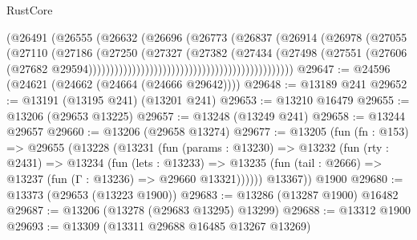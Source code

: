 \begin{lexlean}{RustCore}
\begin{coremodule}
                                                            (@26491
                                                              (@26555
                                                                (@26632
                                                                  (@26696
                                                                    (@26773
                                                                      (@26837
                                                                        (@26914
                                                                          (@26978
                                                                            (@27055
                                                                              (@27110
                                                                                (@27186
                                                                                  (@27250
                                                                                    (@27327
                                                                                      (@27382
                                                                                        (@27434
                                                                                          (@27498
                                                                                            (@27551
                                                                                              (@27606
                                                                                                (@27682
                                                                                                  @29594)))))))))))))))))))))))))))))))))))))))))))))))
@29647 := @24596 (@24621 (@24662 (@24664 (@24666 @29642))))
@29648 := @13189 @241
@29652 := @13191 (@13195 @241) (@13201 @241)
@29653 := @13210 @16479
@29655 := @13206 (@29653 @13225)
@29657 := @13248 (@13249 @241)
@29658 := @13244 @29657
@29660 := @13206 (@29658 @13274)
@29677 := @13205
    (fun (fn : @153) =>
    @29655
      (@13228
        (@13231
          (fun (params : @13230) =>
          @13232
            (fun (rty : @2431) =>
            @13234
              (fun (lets : @13233) =>
              @13235 (fun (tail : @2666) => @13237 (fun (Γ : @13236) => @29660 @13321))))))
        @13367))
    @1900
@29680 := @13373 (@29653 (@13223 @1900))
@29683 := @13286 (@13287 @1900) @16482
@29687 := @13206 (@13278 (@29683 @13295) @13299)
@29688 := @13312 @1900
@29693 := @13309 (@13311 @29688 @16485 @13267 @13269)

\end{coremodule}
\end{lexlean}
